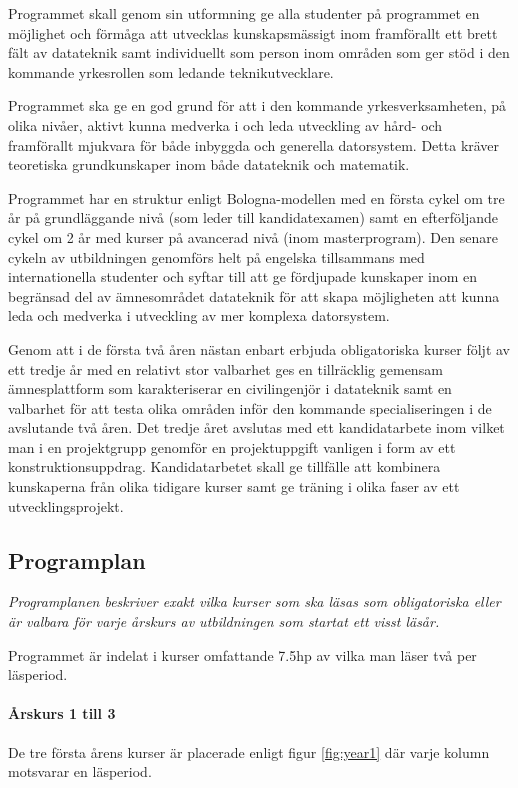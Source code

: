 \documentclass[twocolumn]{article}
\newcommand{\meta}[1]{{\small \emph{#1}}}
\begin{document}
Programmet skall genom sin utformning ge alla studenter på programmet
en möjlighet och förmåga att utvecklas kunskapsmässigt inom
framförallt ett brett fält av datateknik samt individuellt som person
inom områden som ger stöd i den kommande yrkesrollen som ledande
teknikutvecklare.

Programmet ska ge en god grund för att i den kommande
yrkesverksamheten, på olika nivåer, aktivt kunna medverka i och leda
utveckling av hård- och framförallt mjukvara för både inbyggda och
generella datorsystem. Detta kräver teoretiska grundkunskaper inom
både datateknik och matematik.

Programmet har en struktur enligt Bologna-modellen med en första cykel
om tre år på grundläggande nivå (som leder till kandidatexamen) samt
en efterföljande cykel om 2 år med kurser på avancerad nivå (inom
masterprogram). Den senare cykeln av utbildningen genomförs helt på
engelska tillsammans med internationella studenter och syftar till att
ge fördjupade kunskaper inom en begränsad del av ämnesområdet
datateknik för att skapa möjligheten att kunna leda och medverka i
utveckling av mer komplexa datorsystem.

Genom att i de första två åren nästan enbart erbjuda obligatoriska
kurser följt av ett tredje år med en relativt stor valbarhet ges en
tillräcklig gemensam ämnesplattform som karakteriserar en
civilingenjör i datateknik samt en valbarhet för att testa olika
områden inför den kommande specialiseringen i de avslutande två åren.
Det tredje året avslutas med ett kandidatarbete inom vilket man i en
projektgrupp genomför en projektuppgift vanligen i form av ett
konstruktionsuppdrag. Kandidatarbetet skall ge tillfälle att kombinera
kunskaperna från olika tidigare kurser samt ge träning i olika faser
av ett utvecklingsprojekt.

\subsection{Programplan}

\meta{Programplanen beskriver exakt vilka kurser som ska läsas som
  obligatoriska eller är valbara för varje årskurs av utbildningen
  som startat ett visst läsår.}

Programmet är indelat i kurser omfattande 7.5hp av vilka man läser
två per läsperiod.
\paragraph{Årskurs 1 till 3} De tre första årens kurser är placerade
enligt figur \ref{fig:year1} där varje kolumn motsvarar en läsperiod.
\end{document}
